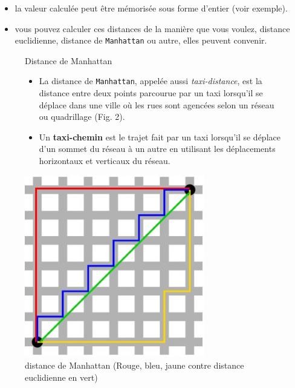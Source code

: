 \begin{rem}
\begin{itemize}
\item la valeur calculée peut être mémorisée sous forme d'entier (voir exemple).\\
\item vous pouvez calculer ces distances de la manière que vous voulez, distance euclidienne, distance de \texttt{Manhattan} ou autre, elles peuvent convenir.\\
\end{itemize}
\end{rem}


\begin{figure}[!h]
\begin{minipage}{0.6\textwidth}
\begin{defi}{Distance de Manhattan}
\begin{itemize}
\item La distance de \texttt{Manhattan}, appelée aussi \textit{taxi-distance}, est la distance entre deux points parcourue par un taxi lorsqu'il se déplace dans une ville où les rues sont agencées selon un réseau ou quadrillage (Fig. 2). 

\item Un \textbf{taxi-chemin} est le trajet fait par un taxi lorsqu'il se déplace d'un sommet du réseau à un autre en utilisant les déplacements horizontaux et verticaux du réseau.
\end{itemize}

\end{defi}
\end{minipage}
\begin{minipage}{0.4\textwidth}
\begin{center}
\includegraphics[width=0.7\textwidth]{images/manhattan.jpg}
\caption{distance de Manhattan (Rouge, bleu, jaune contre distance euclidienne en vert)}
\end{center}
\end{minipage}
\end{figure}


